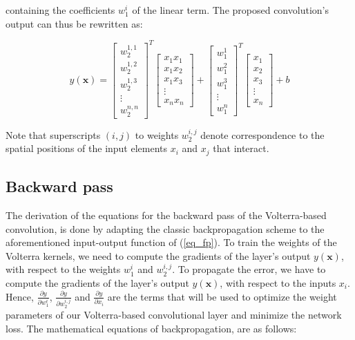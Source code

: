 \documentclass[10pt,twocolumn,letterpaper]{article}
\renewcommand{\vec}[1]{\mathbf{#1}}
\begin{document}
containing the coefficients $w_1^i$ of the linear term. The proposed convolution's output can thus be rewritten as:

       \begin{equation}
       y(\vec{x}) =
       \begin{bmatrix}
       w_2^{1,1}\\ w_2^{1,2}\\ w_2^{1,3}\\ \vdots \\ w_2^{n,n}
       \end{bmatrix}^T
       \begin{bmatrix}
       x_1x_1 \\ x_1x_2 \\ x_1x_3 \\ \vdots \\ x_nx_n
       \end{bmatrix}
       +
       \begin{bmatrix}
       w_1^1 \\ w_1^2 \\ w_1^3 \\ \vdots \\ w_1^n
       \end{bmatrix}^T
       \begin{bmatrix}
       x_1 \\ x_2 \\ x_3 \\ \vdots \\ x_n
       \end{bmatrix}
       + b
       \end{equation}
       
Note that superscripts $(i,j)$ to weights $w_2^{i,j}$ denote correspondence to the spatial positions of the input elements $x_i$ and $x_j$ that interact.
       

       
\subsection{Backward pass}
\label{Sect:bp}
       
The derivation of the equations for the backward pass of the Volterra-based convolution, is done by adapting the classic backpropagation scheme to the aforementioned input-output function of (\ref{eq_fp}). To train the weights of the Volterra kernels, we need to compute the gradients of the layer's output $y(\vec{x})$, with respect to the weights $w_1^i$ and $w_2^{i,j}$. To propagate the error, we have to compute the gradients of the layer's output $y(\vec{x})$, with respect to the inputs $x_i$. Hence, $\frac{\partial y}{\partial w_1^i}$, $\frac{\partial y}{\partial w_2^{i,j}}$ and $\frac{\partial y}{\partial {x_i}}$ are the terms that will be used to optimize the weight parameters of our Volterra-based convolutional layer and minimize the network loss. The mathematical equations of backpropagation, are as follows:
\end{document}
